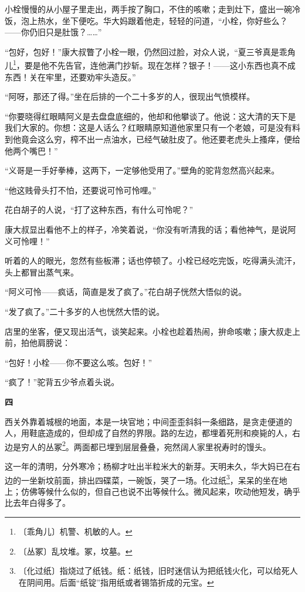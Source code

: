 \documentclass[12pt,UTF-8,openany]{ctexbook}
\begin{document}
\begin{normalsize}
    小栓慢慢的从小屋子里走出，两手按了胸口，不住的咳嗽；走到灶下，盛出一碗冷饭，泡上热水，坐下便吃。华大妈跟着他走，轻轻的问道，“小栓，你好些么？——你仍旧只是肚饿？……”
    
    “包好，包好！”康大叔瞥了小栓一眼，仍然回过脸，对众人说，“夏三爷真是乖角儿\footnote{〔乖角儿〕机警、机敏的人。}，要是他不先告官，连他满门抄斩。现在怎样？银子！——这小东西也真不成东西！关在牢里，还要劝牢头造反。”
    
    “阿呀，那还了得。”坐在后排的一个二十多岁的人，很现出气愤模样。
    
    “你要晓得红眼睛阿义是去盘盘底细的，他却和他攀谈了。他说：这大清的天下是我们大家的。你想：这是人话么？红眼睛原知道他家里只有一个老娘，可是没有料到他竟会这么穷，榨不出一点油水，已经气破肚皮了。他还要老虎头上搔痒，便给他两个嘴巴！”
    
    “义哥是一手好拳棒，这两下，一定够他受用了。”壁角的驼背忽然高兴起来。
    
    “他这贱骨头打不怕，还要说可怜可怜哩。”
    
    花白胡子的人说，“打了这种东西，有什么可怜呢？”
    
    康大叔显出看他不上的样子，冷笑着说，“你没有听清我的话；看他神气，是说阿义可怜哩！”
    
    听着的人的眼光，忽然有些板滞；话也停顿了。小栓已经吃完饭，吃得满头流汗，头上都冒出蒸气来。
    
    “阿义可怜——疯话，简直是发了疯了。”花白胡子恍然大悟似的说。
    
    “发了疯了。”二十多岁的人也恍然大悟的说。
    
    店里的坐客，便又现出活气，谈笑起来。小栓也趁着热闹，拚命咳嗽；康大叔走上前，拍他肩膀说：
    
    “包好！小栓——你不要这么咳。包好！”
    
    “疯了！”驼背五少爷点着头说。
    
    \begin{center}\textbf{四}\end{center}
    
    西关外靠着城根的地面，本是一块官地；中间歪歪斜斜一条细路，是贪走便道的人，用鞋底造成的，但却成了自然的界限。路的左边，都埋着死刑和瘐毙的人，右边是穷人的丛冢\footnote{〔丛冢〕乱坟堆。冢，坟墓。}。两面都已埋到层层叠叠，宛然阔人家里祝寿时的馒头。
    
    这一年的清明，分外寒冷；杨柳才吐出半粒米大的新芽。天明未久，华大妈已在右边的一坐新坟前面，排出四碟菜，一碗饭，哭了一场。化过纸\footnote{〔化过纸〕指烧过了纸钱。纸：纸钱，旧时迷信认为把纸钱火化，可以给死人在阴间用。后面“纸锭”指用纸或者锡箔折成的元宝。}，呆呆的坐在地上；仿佛等候什么似的，但自己也说不出等候什么。微风起来，吹动他短发，确乎比去年白得多了。
    

\end{normalsize}
\end{document}
